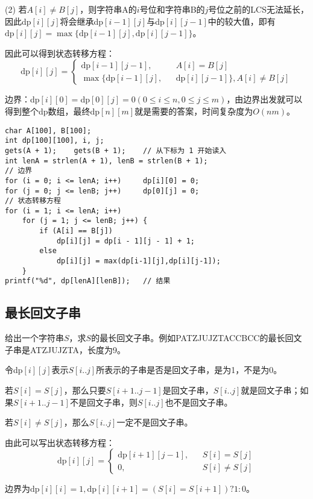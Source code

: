 (2) 若$A[i]\neq B[j]$，则字符串A的$i$号位和字符串B的$j$号位之前的LCS无法延长，因此dp$[i][j]$将会继承dp$[i-1][j]$与dp$[i][j-1]$中的较大值，即有$\textrm{dp}[i][j]=\max\{\textrm{dp}[i-1][j],\textrm{dp}[i][j-1]\}$。

因此可以得到状态转移方程：
$$
\textrm{dp}[i][j]=\left\{
	\begin{aligned}
		\textrm{dp}[i-1][j-1], & & A[i]=B[j] \\
		\max\{\textrm{dp}[i-1][j], & & \textrm{dp}[i][j-1]\},A[i]\neq B[j]
	\end{aligned}
\right.
$$

边界：dp$[i][0]=$dp$[0][j]=0(0\leq i\leq n,0\leq j\leq m)$，由边界出发就可以得到整个dp数组，最终dp$[n][m]$就是需要的答案，时间复杂度为$O(nm)$。

\begin{lstlisting}
char A[100], B[100];
int dp[100][100], i, j;
gets(A + 1);	gets(B + 1);	// 从下标为 1 开始读入
int lenA = strlen(A + 1), lenB = strlen(B + 1);
// 边界
for (i = 0; i <= lenA; i++)		dp[i][0] = 0;
for (j = 0; j <= lenB; j++)		dp[0][j] = 0;
// 状态转移方程
for (i = 1; i <= lenA; i++)
	for (j = 1; j <= lenB; j++) {
		if (A[i] == B[j]) 
			dp[i][j] = dp[i - 1][j - 1] + 1;
		else
			dp[i][j] = max(dp[i-1][j],dp[i][j-1]);
	}
printf("%d", dp[lenA][lenB]);	// 结果
\end{lstlisting}

\subsection{最长回文子串}

给出一个字符串$S$，求$S$的最长回文子串。例如PATZJUJZTACCBCC的最长回文子串是ATZJUJZTA，长度为9。

令dp$[i][j]$表示$S[i..j]$所表示的子串是否是回文子串，是为1，不是为0。

若$S[i]=S[j]$，那么只要$S[i+1..j-1]$是回文子串，$S[i..j]$就是回文子串；如果$S[i+1..j-1]$不是回文子串，则$S[i..j]$也不是回文子串。

若$S[i]\neq S[j]$，那么$S[i..j]$一定不是回文子串。

由此可以写出状态转移方程：
$$
\textrm{dp}[i][j]=\left\{
	\begin{aligned}
	\textrm{dp}[i+1][j-1],& & S[i]=S[j] \\
	0, & & S[i]\neq S[j]
	\end{aligned}
\right.
$$

边界为$\textrm{dp}[i][i]=1,\textrm{dp}[i][i+1]=(S[i]=S[i+1])?1:0$。
